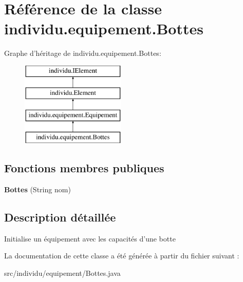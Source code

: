 \hypertarget{classindividu_1_1equipement_1_1_bottes}{\section{Référence de la classe individu.\-equipement.\-Bottes}
\label{classindividu_1_1equipement_1_1_bottes}
}
Graphe d'héritage de individu.\-equipement.\-Bottes\-:\begin{figure}[H]
\begin{center}
\leavevmode
\includegraphics[height=4.000000cm]{classindividu_1_1equipement_1_1_bottes}
\end{center}
\end{figure}
\subsection*{Fonctions membres publiques}
\begin{DoxyCompactItemize}
\item 
\hypertarget{classindividu_1_1equipement_1_1_bottes_aa3558953e68ab09d53d2e99d620bd295}{{\bfseries Bottes} (String nom)}\label{classindividu_1_1equipement_1_1_bottes_aa3558953e68ab09d53d2e99d620bd295}

\end{DoxyCompactItemize}


\subsection{Description détaillée}
Initialise un équipement avec les capacités d'une botte 

La documentation de cette classe a été générée à partir du fichier suivant \-:\begin{DoxyCompactItemize}
\item 
src/individu/equipement/Bottes.\-java\end{DoxyCompactItemize}
